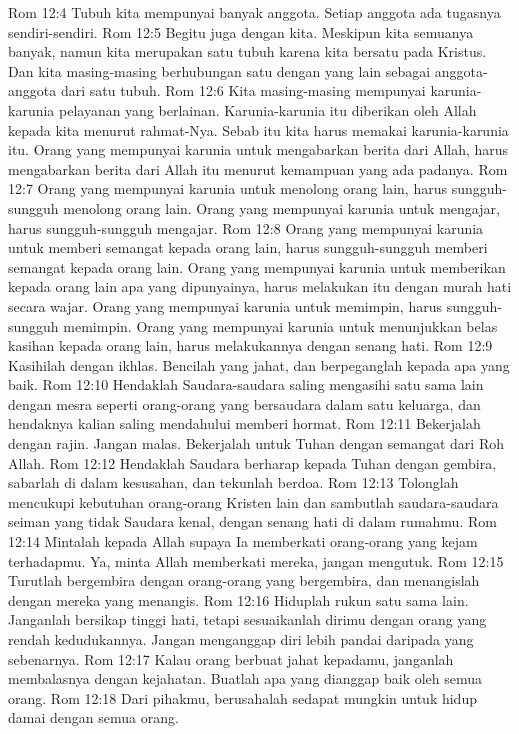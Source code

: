 Rom 12:4  Tubuh kita mempunyai banyak anggota. Setiap anggota ada tugasnya sendiri-sendiri.
Rom 12:5  Begitu juga dengan kita. Meskipun kita semuanya banyak, namun kita merupakan satu tubuh karena kita bersatu pada Kristus. Dan kita masing-masing berhubungan satu dengan yang lain sebagai anggota-anggota dari satu tubuh.
Rom 12:6  Kita masing-masing mempunyai karunia-karunia pelayanan yang berlainan. Karunia-karunia itu diberikan oleh Allah kepada kita menurut rahmat-Nya. Sebab itu kita harus memakai karunia-karunia itu. Orang yang mempunyai karunia untuk mengabarkan berita dari Allah, harus mengabarkan berita dari Allah itu menurut kemampuan yang ada padanya.
Rom 12:7  Orang yang mempunyai karunia untuk menolong orang lain, harus sungguh-sungguh menolong orang lain. Orang yang mempunyai karunia untuk mengajar, harus sungguh-sungguh mengajar.
Rom 12:8  Orang yang mempunyai karunia untuk memberi semangat kepada orang lain, harus sungguh-sungguh memberi semangat kepada orang lain. Orang yang mempunyai karunia untuk memberikan kepada orang lain apa yang dipunyainya, harus melakukan itu dengan murah hati secara wajar. Orang yang mempunyai karunia untuk memimpin, harus sungguh-sungguh memimpin. Orang yang mempunyai karunia untuk menunjukkan belas kasihan kepada orang lain, harus melakukannya dengan senang hati.
Rom 12:9  Kasihilah dengan ikhlas. Bencilah yang jahat, dan berpeganglah kepada apa yang baik.
Rom 12:10  Hendaklah Saudara-saudara saling mengasihi satu sama lain dengan mesra seperti orang-orang yang bersaudara dalam satu keluarga, dan hendaknya kalian saling mendahului memberi hormat.
Rom 12:11  Bekerjalah dengan rajin. Jangan malas. Bekerjalah untuk Tuhan dengan semangat dari Roh Allah.
Rom 12:12  Hendaklah Saudara berharap kepada Tuhan dengan gembira, sabarlah di dalam kesusahan, dan tekunlah berdoa.
Rom 12:13  Tolonglah mencukupi kebutuhan orang-orang Kristen lain dan sambutlah saudara-saudara seiman yang tidak Saudara kenal, dengan senang hati di dalam rumahmu.
Rom 12:14  Mintalah kepada Allah supaya Ia memberkati orang-orang yang kejam terhadapmu. Ya, minta Allah memberkati mereka, jangan mengutuk.
Rom 12:15  Turutlah bergembira dengan orang-orang yang bergembira, dan menangislah dengan mereka yang menangis.
Rom 12:16  Hiduplah rukun satu sama lain. Janganlah bersikap tinggi hati, tetapi sesuaikanlah dirimu dengan orang yang rendah kedudukannya. Jangan menganggap diri lebih pandai daripada yang sebenarnya.
Rom 12:17  Kalau orang berbuat jahat kepadamu, janganlah membalasnya dengan kejahatan. Buatlah apa yang dianggap baik oleh semua orang.
Rom 12:18  Dari pihakmu, berusahalah sedapat mungkin untuk hidup damai dengan semua orang.
